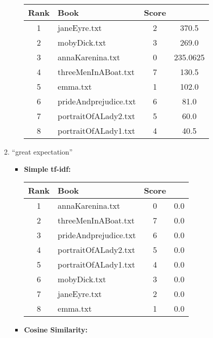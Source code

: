 \documentclass[a4paper,11pt,oneside]{book}
\begin{document}
\begin{enumerate}
\begin{enumerate}
\begin{itemize}
										\begin{tabular}{clcc}
											\toprule
												\textbf{Rank} & \textbf{Book} & \textbf{Score}\\
											\hline
												1	&	janeEyre.txt	&	2	&	370.5	\\
												2	&	mobyDick.txt	&	3	&	269.0	\\
												3	&	annaKarenina.txt	&	0	&	235.0625	\\
												4	&	threeMenInABoat.txt	&	7	&	130.5	\\
												5	&	emma.txt	&	1	&	102.0	\\
												6	&	prideAndprejudice.txt	&	6	&	81.0	\\
												7	&	portraitOfALady2.txt	&	5	&	60.0	\\
												8	&	portraitOfALady1.txt	&	4	&	40.5	\\
											\bottomrule
										\end{tabular}\newline
						\end{itemize}
						
			\item ``great expectation''
						\begin{itemize}
							\item \textbf{Simple tf-idf:}
							
										\begin{tabular}{clcc}
											\toprule
												\textbf{Rank} & \textbf{Book} & \textbf{Score}\\
											\hline
												1	&	annaKarenina.txt	&	0	&	0.0	\\
												2	&	threeMenInABoat.txt	&	7	&	0.0	\\
												3	&	prideAndprejudice.txt	&	6	&	0.0	\\
												4	&	portraitOfALady2.txt	&	5	&	0.0	\\
												5	&	portraitOfALady1.txt	&	4	&	0.0	\\
												6	&	mobyDick.txt	&	3	&	0.0	\\
												7	&	janeEyre.txt	&	2	&	0.0	\\
												8	&	emma.txt	&	1	&	0.0	\\
											\bottomrule
										\end{tabular}\newline
							\item \textbf{Cosine Similarity:}
							

\end{itemize}
\end{enumerate}
\end{enumerate}
\end{document}
